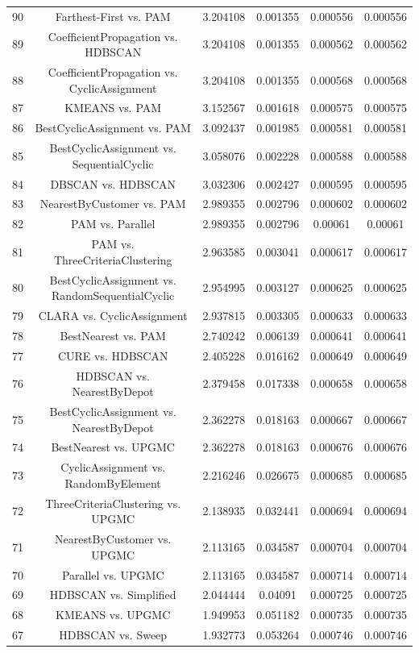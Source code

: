 \documentclass[a4paper,10pt]{article}
\begin{document}
\begin{landscape}
\begin{table}[!htp]
\begin{tabular}{cccccc}
90&Farthest-First vs. PAM&3.204108&0.001355&0.000556&0.000556\\
89&CoefficientPropagation vs. HDBSCAN&3.204108&0.001355&0.000562&0.000562\\
88&CoefficientPropagation vs. CyclicAssignment&3.204108&0.001355&0.000568&0.000568\\
87&KMEANS vs. PAM&3.152567&0.001618&0.000575&0.000575\\
86&BestCyclicAssignment vs. PAM&3.092437&0.001985&0.000581&0.000581\\
85&BestCyclicAssignment vs. SequentialCyclic&3.058076&0.002228&0.000588&0.000588\\
84&DBSCAN vs. HDBSCAN&3.032306&0.002427&0.000595&0.000595\\
83&NearestByCustomer vs. PAM&2.989355&0.002796&0.000602&0.000602\\
82&PAM vs. Parallel&2.989355&0.002796&0.00061&0.00061\\
81&PAM vs. ThreeCriteriaClustering&2.963585&0.003041&0.000617&0.000617\\
80&BestCyclicAssignment vs. RandomSequentialCyclic&2.954995&0.003127&0.000625&0.000625\\
79&CLARA vs. CyclicAssignment&2.937815&0.003305&0.000633&0.000633\\
78&BestNearest vs. PAM&2.740242&0.006139&0.000641&0.000641\\
77&CURE vs. HDBSCAN&2.405228&0.016162&0.000649&0.000649\\
76&HDBSCAN vs. NearestByDepot&2.379458&0.017338&0.000658&0.000658\\
75&BestCyclicAssignment vs. NearestByDepot&2.362278&0.018163&0.000667&0.000667\\
74&BestNearest vs. UPGMC&2.362278&0.018163&0.000676&0.000676\\
73&CyclicAssignment vs. RandomByElement&2.216246&0.026675&0.000685&0.000685\\
72&ThreeCriteriaClustering vs. UPGMC&2.138935&0.032441&0.000694&0.000694\\
71&NearestByCustomer vs. UPGMC&2.113165&0.034587&0.000704&0.000704\\
70&Parallel vs. UPGMC&2.113165&0.034587&0.000714&0.000714\\
69&HDBSCAN vs. Simplified&2.044444&0.04091&0.000725&0.000725\\
68&KMEANS vs. UPGMC&1.949953&0.051182&0.000735&0.000735\\
67&HDBSCAN vs. Sweep&1.932773&0.053264&0.000746&0.000746\\

\end{tabular}
\end{table}
\end{landscape}
\end{document}
